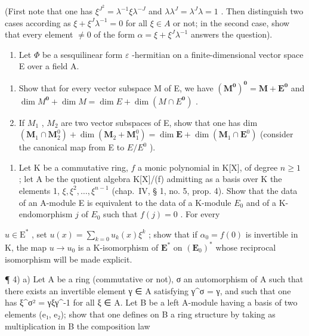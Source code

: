 (First note that one has \(\xi^{J^2} = \lambda^{-1}\xi\lambda^{-J}\) and \(\lambda\lambda^J = \lambda^J\lambda = 1\) . Then distinguish two cases according as \(\xi + \xi^J\lambda^{-1} = 0\) for all \(\xi \in A\) or not; in the second case, show that every element \(\neq 0\) of the form \(\alpha = \xi + \xi^J\lambda^{-1}\) answers the question).

\begin{enumerate}
\def\labelenumi{\arabic{enumi})}
\setcounter{enumi}{1}
\tightlist
\item
  Let \(\Phi\) be a sesquilinear form \(\varepsilon\) -hermitian on a finite-dimensional vector space E over a field A.
\end{enumerate}

\begin{enumerate}
\def\labelenumi{\alph{enumi})}
\item
  Show that for every vector subspace M of E, we have \((\mathbf{M}^{\mathbf{0}})^{\mathbf{0}} = \mathbf{M} + \mathbf{E}^{\mathbf{0}}\) and \(\dim M^{\mathbf{0}} + \dim M = \dim E + \dim (M \cap E^{\mathbf{0}})\) .
\item
  If \(M_{1}\) , \(M_{2}\) are two vector subspaces of E, show that one has dim \((\mathbf{M}_{1} \cap \mathbf{M}_{2}^{0}) + \dim (\mathbf{M}_{2} + \mathbf{M}_{1}^{0}) = \dim \mathbf{E} + \dim (\mathbf{M}_{1} \cap \mathbf{E}^{0})\) (consider the canonical map from E to \(E/E^{0}\) ).
\end{enumerate}

\begin{enumerate}
\def\labelenumi{\arabic{enumi})}
\setcounter{enumi}{2}
\tightlist
\item
  Let K be a commutative ring, \(f\) a monic polynomial in K{[}X{]}, of degree \(n \geqslant 1\) ; let A be the quotient algebra K{[}X{]}/(f) admitting as a basis over K the elements 1, \(\xi, \xi^2, \ldots, \xi^{n-1}\) (chap.~IV, § 1, no. 5, prop. 4). Show that the data of an A-module E is equivalent to the data of a K-module \(E_0\) and of a K-endomorphism \(j\) of \(E_0\) such that \(f(j) = 0\) . For every
\end{enumerate}

\(u \in \mathrm{E}^*\) , set \(u(x) = \sum_{k=0} u_k(x)\xi^k\) ; show that if \(\alpha_0 = f(0)\) is invertible in K, the map \(u \to u_0\) is a K-isomorphism of \(\mathbf{E}^*\) on \((\mathbf{E}_0)^*\) whose reciprocal isomorphism will be made explicit.

¶ 4) a) Let A be a ring (commutative or not), σ an automorphism of A such that there exists an invertible element γ ∈ A satisfying γ\^{}σ = γ, and such that one has ξ\^{}σ² = γξγ\^{}-1 for all ξ ∈ A. Let B be a left A-module having a basis of two elements (e₁, e₂); show that one defines on B a ring structure by taking as multiplication in B the composition law

